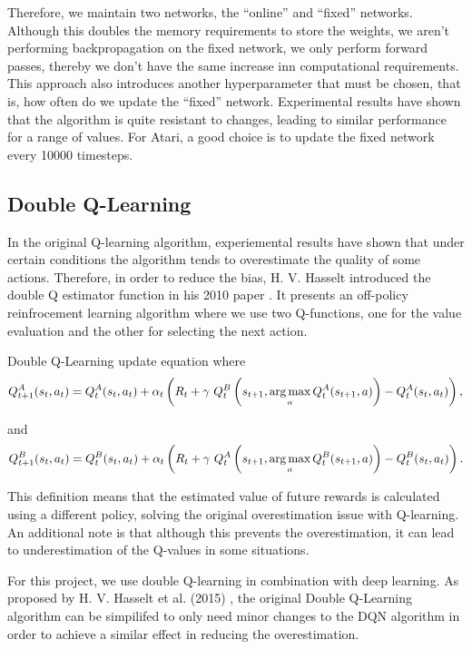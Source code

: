 Therefore, we maintain two networks, the ``online'' and ``fixed'' networks. Although this doubles the memory requirements to store the weights, we aren't performing backpropagation on the fixed network, we only perform forward passes, thereby we don't have the same increase inn computational requirements. This approach also introduces another hyperparameter that must be chosen, that is, how often do we update the ``fixed'' network. Experimental results have shown that the algorithm is quite resistant to changes, leading to similar performance for a range of values. For Atari, a good choice is to update the fixed network every 10000 timesteps.

\subsection{Double Q-Learning}
\label{dsgn:sec:qlearning:doubledqn}
In the original Q-learning algorithm, experiemental results have shown that under certain conditions the algorithm tends to overestimate the quality of some actions. Therefore, in order to reduce the bias, H. V. Hasselt introduced the double Q estimator function in his 2010 paper \cite{double-ql}. It presents an off-policy reinfrocement learning algorithm where we use two Q-functions, one for the value evaluation and the other for selecting the next action.

\begin{defn}
	Double Q-Learning update equation where
	\[
		Q_{t+1}^A (s_t, a_t) = Q_t^A (s_t, a_t) + \alpha_t \left( R_t + \gamma~Q_t^B \left( s_{t + 1}, \operatorname*{arg\,max}_a Q_t^A (s_{t + 1}, a) \right) - Q_t^A (s_t, a_t) \right) ,
	\]

	and
	\[
		Q_{t+1}^B (s_t, a_t) = Q_t^B (s_t, a_t) + \alpha_t \left( R_t + \gamma~Q_t^A \left( s_{t + 1}, \operatorname*{arg\,max}_a Q_t^B (s_{t + 1}, a) \right) - Q_t^B (s_t, a_t) \right) .
	\]
\end{defn}

This definition means that the estimated value of future rewards is calculated using a different policy, solving the original overestimation issue with Q-learning. An additional note is that although this prevents the overestimation, it can lead to underestimation of the Q-values in some situations.

For this project, we use double Q-learning in combination with deep learning. As proposed by H. V. Hasselt et al. (2015) \cite{deep-double-qlearning}, the original Double Q-Learning algorithm can be simpilifed to only need minor changes to the DQN algorithm in order to achieve a similar effect in reducing the overestimation.

